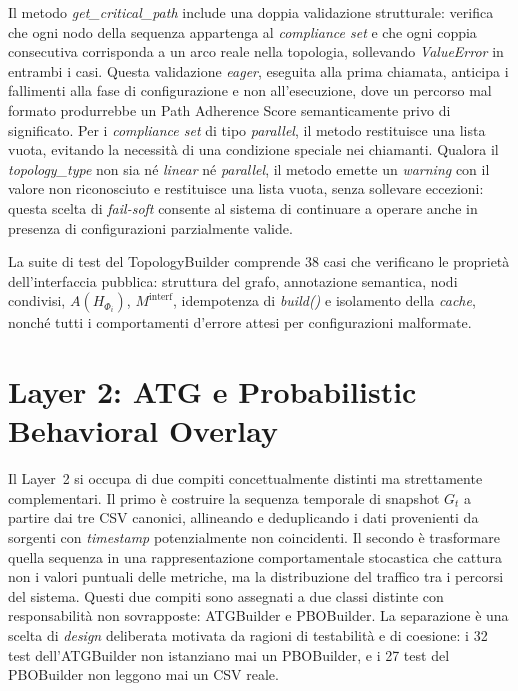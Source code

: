 Il metodo \textit{get\_critical\_path} include una doppia validazione strutturale: verifica
che ogni nodo della sequenza appartenga al \textit{compliance set} e che ogni coppia
consecutiva corrisponda a un arco reale nella topologia, sollevando \textit{ValueError} in
entrambi i casi. Questa validazione \textit{eager}, eseguita alla prima chiamata, anticipa i
fallimenti alla fase di configurazione e non all'esecuzione, dove un percorso mal formato
produrrebbe un Path Adherence Score semanticamente privo di significato. Per i
\textit{compliance set} di tipo \textit{parallel}, il metodo restituisce una lista vuota,
evitando la necessità di una condizione speciale nei chiamanti. Qualora il
\textit{topology\_type} non sia né \textit{linear} né \textit{parallel}, il metodo emette un
\textit{warning} con il valore non riconosciuto e restituisce una lista vuota, senza sollevare
eccezioni: questa scelta di \textit{fail-soft} consente al sistema di continuare a operare
anche in presenza di configurazioni parzialmente valide.

La suite di test del TopologyBuilder comprende 38 casi che verificano le proprietà
dell'interfaccia pubblica: struttura del grafo, annotazione semantica, nodi condivisi,
$A(H_{\Phi_i})$, $M^{\text{interf}}$, idempotenza di \textit{build()} e isolamento della
\textit{cache}, nonché tutti i comportamenti d'errore attesi per configurazioni malformate.

\section{Layer 2: ATG e Probabilistic Behavioral Overlay}
\label{sec:impl_layer2}

Il Layer~2 si occupa di due compiti concettualmente distinti ma strettamente complementari. Il
primo è costruire la sequenza temporale di snapshot $G_t$ a partire dai tre CSV canonici,
allineando e deduplicando i dati provenienti da sorgenti con \textit{timestamp} potenzialmente
non coincidenti. Il secondo è trasformare quella sequenza in una rappresentazione comportamentale
stocastica che cattura non i valori puntuali delle metriche, ma la distribuzione del traffico tra
i percorsi del sistema. Questi due compiti sono assegnati a due classi distinte con responsabilità
non sovrapposte: ATGBuilder e PBOBuilder. La separazione è una scelta di \textit{design}
deliberata motivata da ragioni di testabilità e di coesione: i 32 test dell'ATGBuilder non
istanziano mai un PBOBuilder, e i 27 test del PBOBuilder non leggono mai un CSV reale.

